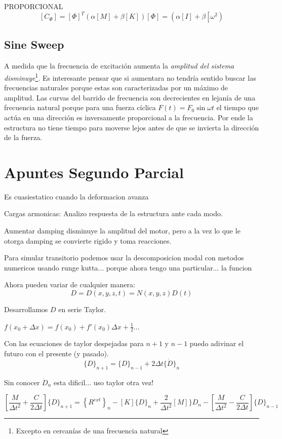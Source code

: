 \documentclass[draft,11pt, a4paper,titlepage]{article}
\begin{document}
PROPORCIONAL
\[
\left[C_{\Phi}\right]=[\Phi]^{T}(\alpha[M]+\beta[K])[\Phi]=\left(\alpha[I]+\beta\left[\omega^{2}\right)\right.
\]



\subsection{Sine Sweep}
A medida que la frecuencia de excitación aumenta la \textit{amplitud del sistema disminuye}\footnote{Excepto en cercanías de una frecuencia natural}. Es interesante pensar que si aumentara no tendría sentido buscar las frecuencias naturales porque estas son caracterizadas por un máximo de amplitud. Las curvas del barrido de frecuencia son decrecientes en lejanía de una frecuencia natural porque para una fuerza cíclica $F(t)=F_0\sin \omega t$ el tiempo que actúa en una dirección es inversamente proporcional a la frecuencia. Por ende la estructura no tiene tiempo para moverse lejos antes de que se invierta la dirección de la fuerza.
%



\section{Apuntes Segundo Parcial}

Es cuasiestatico cuando la deformacion avanza 

Cargas armonicas: Analizo respuesta de la estructura ante cada modo. 

Aumentar damping disminuye la amplitud del motor, pero a la vez lo que le otorga damping se convierte rigido y toma reacciones.

Para simular transitorio podemos usar la descomposicion modal con metodos numericos usando runge kutta... porque ahora tengo una particular... la funcion 

Ahora pueden variar de cualquier manera:
\[
D=D(x,y,z,t) = N(x,y,z)D(t)
\]

Desarrollamos $D$ en serie Taylor.

$f(x_0+\Delta x)= f(x_0) + f'(x_0) \Delta x +\tfrac{1}{2}...$

Con las ecuaciones de taylor despejadas para $n+1$ y $n-1$ puedo adivinar el futuro con el presente (y pasado).
\[
\{D\}_{n+1}=\{D\}_{n-1}+2 \Delta t\{\dot{D}\}_{n}
\]

Sin conocer $\dot{D}_{n}$ esta dificil... uso taylor otra vez!

\[
\left[\frac{M}{\Delta t^{2}}+\frac{C}{2 \Delta t}\right]\{D\}_{n+1}=\left\{R^{e x t}\right\}_{n}-[K]\{D\}_{n}+\frac{2}{\Delta t^{2}}[M] \} D_{n}-\left[\frac{M}{\Delta t^{2}}-\frac{C}{2 \Delta t}\right]\{D\}_{n-1}
\]
\end{document}
